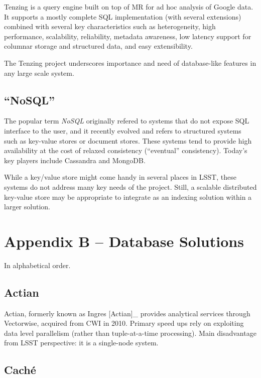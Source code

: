 \documentclass[DM,lsstdraft,toc]{lsstdoc}
\begin{document}
Tenzing is a query engine built on top of MR for ad hoc analysis of
Google data. It supports a mostly complete SQL implementation (with
several extensions) combined with several key characteristics such as
heterogeneity, high performance, scalability, reliability, metadata
awareness, low latency support for columnar storage and structured data,
and easy extensibility.

The Tenzing project underscores importance and need of database-like
features in any large scale system.

\subsection{\texorpdfstring{``NoSQL''}{NoSQL}}\label{nosql}

The popular term \emph{NoSQL} originally refered to systems that do not
expose SQL interface to the user, and it recently evolved and refers to
structured systems such as key-value stores or document stores. These
systems tend to provide high availability at the cost of relaxed
consistency (``eventual'' consistency). Today's key players include
Cassandra and
MongoDB.

While a key/value store might come handy in several places in LSST,
these systems do not address many key needs of the project. Still, a
scalable distributed key-value store may be appropriate to integrate as
an indexing solution within a larger solution.

\section{Appendix B -- Database
Solutions}\label{appendix-b-database-solutions}

In alphabetical order.

\subsection{Actian}\label{actian}

Actian, formerly known as Ingres {[}Actian{]}\_ provides analytical
services through Vectorwise, acquired from CWI in 2010. Primary speed
ups rely on exploiting data level parallelism (rather than
tuple-at-a-time processing). Main disadvantage from LSST perspective: it
is a single-node system.

\subsection{Caché}\label{cachuxe9}
\end{document}
